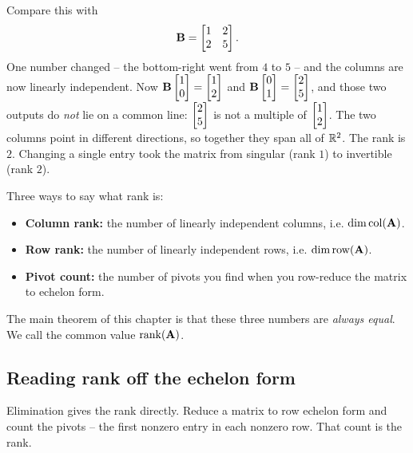 Compare this with
\[
  \mathbf{B} = \begin{bmatrix} 1 & 2 \\ 2 & 5 \end{bmatrix}.
\]
One number changed -- the bottom-right went from $4$ to $5$ -- and the columns
are now linearly independent. Now $\mathbf{B}\begin{bmatrix}1\\0\end{bmatrix} = \begin{bmatrix}1\\2\end{bmatrix}$ and
$\mathbf{B}\begin{bmatrix}0\\1\end{bmatrix} = \begin{bmatrix}2\\5\end{bmatrix}$, and those two outputs do \emph{not} lie
on a common line: $\begin{bmatrix}2\\5\end{bmatrix}$ is not a multiple of $\begin{bmatrix}1\\2\end{bmatrix}$. The two
columns point in different directions, so together they span all of $\mathbb{R}^2$. The
rank is $2$. Changing a single entry took the matrix from singular (rank $1$) to
invertible (rank $2$).

\begin{focusbox}
Three ways to say what rank is:
\begin{itemize}
  \item \textbf{Column rank:} the number of linearly independent columns, i.e.
        $\operatorname{dim} \operatorname{col}(\mathbf{A})$.
  \item \textbf{Row rank:} the number of linearly independent rows, i.e.
        $\operatorname{dim} \operatorname{row}(\mathbf{A})$.
  \item \textbf{Pivot count:} the number of pivots you find when you row-reduce
        the matrix to echelon form.
\end{itemize}
The main theorem of this chapter is that these three numbers are \emph{always
equal}. We call the common value $\operatorname{rank}(\mathbf{A})$.
\end{focusbox}

\subsection{Reading rank off the echelon form}

Elimination gives the rank directly. Reduce a matrix to row echelon form and
count the pivots -- the first nonzero entry in each nonzero row. That count is
the rank.

